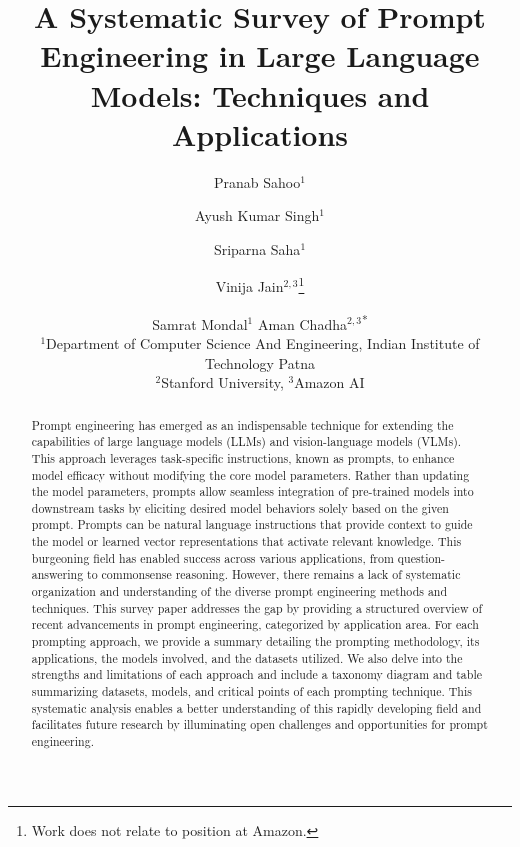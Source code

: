 \documentclass{article}
\title{A Systematic Survey of Prompt Engineering in Large Language Models: Techniques and Applications}
\author{
Pranab Sahoo$^1$
\and
Ayush Kumar Singh$^1$\and
Sriparna Saha$^1$\and
Vinija Jain$^{2,3}$\footnote{Work does not relate to position at Amazon.}\and
Samrat Mondal$^1$\And
Aman Chadha$^{2,3}$\textsuperscript{*}\\
\affiliations
$^1$Department of Computer Science And Engineering, Indian Institute of Technology
Patna\\
$^2$Stanford University, $^3$Amazon AI\\
\emails{
\texttt{\{pranab\_2021cs25, ayush\_2211ai27, sriparna, samrat\}@iitp.ac.in,
hi@vinija.ai,
hi@aman.ai}
} }
\begin{document}
\maketitle

\begin{abstract}
Prompt engineering has emerged as an indispensable technique for extending the capabilities of large language models (LLMs) and vision-language models (VLMs). This approach leverages task-specific instructions, known as prompts, to enhance model efficacy without modifying the core model parameters. Rather than updating the model parameters, prompts allow seamless integration of pre-trained models into downstream tasks by eliciting desired model behaviors solely based on the given prompt. Prompts can be natural language instructions that provide context to guide the model or learned vector representations that activate relevant knowledge. This burgeoning field has enabled success across various applications, from question-answering to commonsense reasoning. However, there remains a lack of systematic organization and understanding of the diverse prompt engineering methods and techniques. This survey paper addresses the gap by providing a structured overview of recent advancements in prompt engineering, categorized by application area. For each prompting approach, we provide a summary detailing the prompting methodology, its applications, the models involved, and the datasets utilized. We also delve into the strengths and limitations of each approach and include a taxonomy diagram and table summarizing datasets, models, and critical points of each prompting technique. This systematic analysis enables a better understanding of this rapidly developing field and facilitates future research by illuminating open challenges and opportunities for prompt engineering.




\end{abstract}
\end{document}
